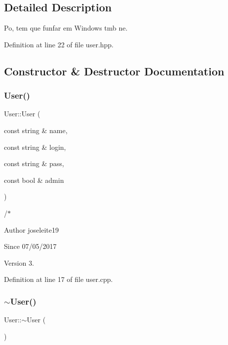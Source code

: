 \subsection{Detailed Description}
Po, tem que funfar em Windows tmb ne. 

Definition at line 22 of file user.\+hpp.



\subsection{Constructor \& Destructor Documentation}
\mbox{\label{class_user_a49a5d96676bc687582401a8feb6d8fab}} 
\subsubsection{\texorpdfstring{User()}{User()}}
{\footnotesize\ttfamily User\+::\+User (\begin{DoxyParamCaption}\item[{const string \&}]{name,  }\item[{const string \&}]{login,  }\item[{const string \&}]{pass,  }\item[{const bool \&}]{admin }\end{DoxyParamCaption})}



/$\ast$ 

\begin{DoxyAuthor}{Author}
joseleite19 
\end{DoxyAuthor}
\begin{DoxySince}{Since}
07/05/2017 
\end{DoxySince}
\begin{DoxyVersion}{Version}
3. 
\end{DoxyVersion}


Definition at line 17 of file user.\+cpp.

\mbox{\label{class_user_ac00b72ad64eb4149f7b21b9f5468c2b2}} 
\subsubsection{\texorpdfstring{$\sim$\+User()}{~User()}}
{\footnotesize\ttfamily User\+::$\sim$\+User (\begin{DoxyParamCaption}{ }\end{DoxyParamCaption})}



